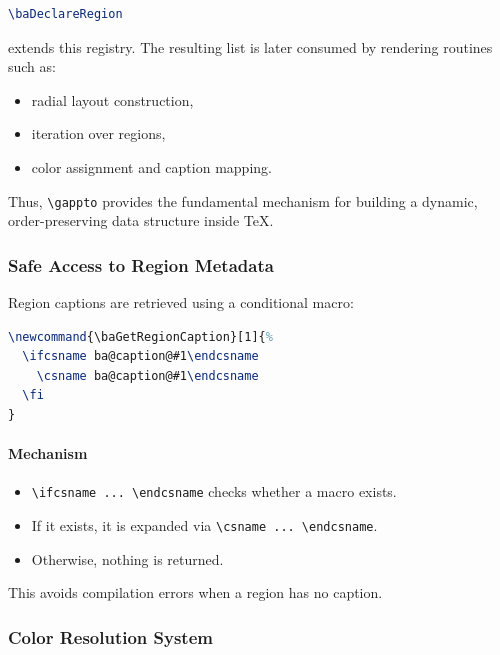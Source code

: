 \begin{lstlisting}[language=LaTeX]
\baDeclareRegion
\end{lstlisting}

extends this registry. The resulting list is later consumed by rendering routines such as:

\begin{itemize}
\item radial layout construction,
\item iteration over regions,
\item color assignment and caption mapping.
\end{itemize}

Thus, \verb|\gappto| provides the fundamental mechanism for building a dynamic, order-preserving data structure inside TeX.

\subsubsection{Safe Access to Region Metadata}

Region captions are retrieved using a conditional macro:

\begin{lstlisting}[language=LaTeX]
\newcommand{\baGetRegionCaption}[1]{%
  \ifcsname ba@caption@#1\endcsname
    \csname ba@caption@#1\endcsname
  \fi
}
\end{lstlisting}

\paragraph{Mechanism}

\begin{itemize}
\item \verb|\ifcsname ... \endcsname| checks whether a macro exists.
\item If it exists, it is expanded via \verb|\csname ... \endcsname|.
\item Otherwise, nothing is returned.
\end{itemize}

This avoids compilation errors when a region has no caption.



\subsubsection{Color Resolution System}

